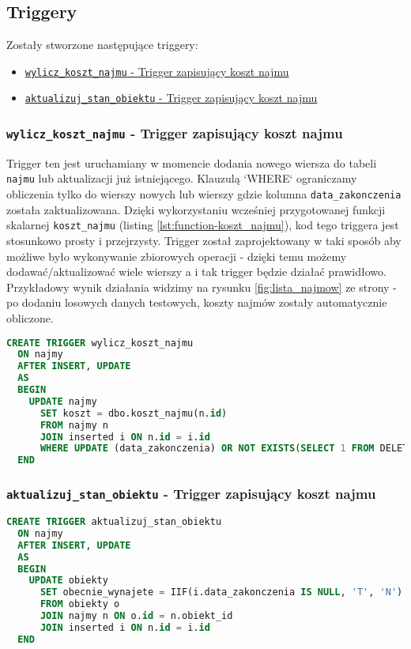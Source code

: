\subsection{Triggery}

Zostały stworzone następujące triggery:
\begin{itemize}
	\item \href{run:Sources/SQL/5. Triggery/019_Utworzenie_triggeru_aktualizujacego_koszt_najmu.sql}{\texttt{wylicz\_koszt\_najmu} - Trigger zapisujący koszt najmu}
	\item \href{run:Sources/SQL/5. Triggery/036_Utworzenie_triggeru_aktualizujacego_stan_obiekty.sql}{\texttt{aktualizuj\_stan\_obiektu} - Trigger zapisujący koszt najmu}
\end{itemize}

\subsubsection{\texttt{wylicz\_koszt\_najmu} - Trigger zapisujący koszt najmu}

Trigger ten jest uruchamiany w momencie dodania nowego wiersza do tabeli \texttt{najmu} lub aktualizacji już istniejącego. Klauzulą `WHERE` ograniczamy obliczenia tylko do wierszy nowych lub wierszy gdzie kolumna \texttt{data\_zakonczenia} została zaktualizowana. Dzięki wykorzystaniu wcześniej przygotowanej funkcji skalarnej \texttt{koszt\_najmu} (listing \ref{lst:function-koszt_najmu}), kod tego triggera jest stosunkowo prosty i przejrzysty. Trigger został zaprojektowany w taki sposób aby możliwe było wykonywanie zbiorowych operacji - dzięki temu możemy dodawać/aktualizować wiele wierszy a i tak trigger będzie działać prawidłowo. Przykładowy wynik działania widzimy na rysunku \ref{fig:lista_najmow} ze strony \pageref{fig:lista_najmow} - po dodaniu losowych danych testowych, koszty najmów zostały automatycznie obliczone.

\begin{lstlisting}[language=SQL, caption={Skrypt tworzący trigger \texttt{wylicz\_koszt\_najmu}}, label={lst:trigger-wylicz_koszt_najmu}]
CREATE TRIGGER wylicz_koszt_najmu
  ON najmy
  AFTER INSERT, UPDATE
  AS
  BEGIN
    UPDATE najmy
      SET koszt = dbo.koszt_najmu(n.id)
      FROM najmy n
      JOIN inserted i ON n.id = i.id
      WHERE UPDATE (data_zakonczenia) OR NOT EXISTS(SELECT 1 FROM DELETED)
  END
\end{lstlisting}


\subsubsection{\texttt{aktualizuj\_stan\_obiektu} - Trigger zapisujący koszt najmu}


\begin{lstlisting}[language=SQL, caption={Skrypt tworzący trigger \texttt{aktualizuj\_stan\_obiektu}}, label={lst:trigger-aktualizuj_stan_obiektu}]
CREATE TRIGGER aktualizuj_stan_obiektu
  ON najmy
  AFTER INSERT, UPDATE
  AS
  BEGIN
    UPDATE obiekty
      SET obecnie_wynajete = IIF(i.data_zakonczenia IS NULL, 'T', 'N')
      FROM obiekty o
      JOIN najmy n ON o.id = n.obiekt_id
      JOIN inserted i ON n.id = i.id
  END
\end{lstlisting}